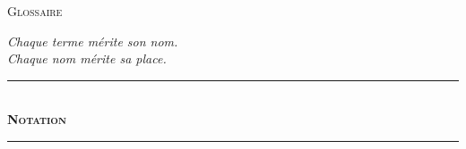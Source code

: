 \documentclass[10pt, openany, oneside]{book}
\renewcommand{\normalsize}{\fontsize{10}{13}\selectfont}
\renewcommand{\huge}{\fontsize{17}{21}\selectfont}
\begin{document}
%
%
%

\newpage

\begin{center}
    {\huge\scshape Glossaire}
\end{center}

\vspace{1.5em}

\begin{center}
    \itshape
    Chaque terme mérite son nom.\\
    Chaque nom mérite sa place.
\end{center}

\vspace{2em}


\begin{center}
    \rule{0.3\textwidth}{0.4pt}\\[0.5em]
    {\normalsize\bfseries\scshape Notation}\\[0.3em]
    \rule{0.3\textwidth}{0.4pt}
\end{center}

\vspace{1em}
\end{document}
